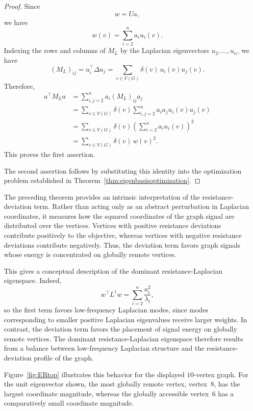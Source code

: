 \documentclass[12pt,a4paper]{amsart}
\theoremstyle{remark}
\theoremstyle{definition}
\newcommand{\1}{\mathbf{1}}
\newcommand{\0}{\mathbf{0}}
\begin{document}
\begin{proof}
Since
\[
w=Ua,
\]
we have
\[
w(v)
=
\sum_{i=2}^{n}a_i u_i(v).
\]
Indexing the rows and columns of $M_L$ by the Laplacian eigenvectors
$u_2,\ldots,u_n$, we have
\[
(M_L)_{ij}
=
u_i^\top\Delta u_j
=
\sum_{v\in V(G)}
\delta(v)\,u_i(v)u_j(v).
\]
Therefore,
\begin{align*}
a^\top M_La
&=
\sum_{i,j=2}^{n}
a_i(M_L)_{ij}a_j\\
&=
\sum_{v\in V(G)}
\delta(v)
\sum_{i,j=2}^{n}
a_i a_j u_i(v)u_j(v)\\
&=
\sum_{v\in V(G)}
\delta(v)
\left(
\sum_{i=2}^{n}
a_i u_i(v)
\right)^2\\
&=
\sum_{v\in V(G)}
\delta(v)\,w(v)^2.
\end{align*}
This proves the first assertion.

The second assertion follows by substituting this identity into the
optimization problem established in
Theorem~\ref{thm:eigenbasisoptimization}.
\end{proof}

The preceding theorem provides an intrinsic interpretation of the
resistance-deviation term. Rather than acting only as an abstract
perturbation in Laplacian coordinates, it measures how the squared
coordinates of the graph signal are distributed over the vertices.
Vertices with positive resistance deviations contribute positively to
the objective, whereas vertices with negative resistance deviations
contribute negatively. Thus, the deviation term favors graph signals
whose energy is concentrated on globally remote vertices.

This gives a conceptual description of the dominant
resistance-Laplacian eigenspace. Indeed,
\[
w^\top L^\dagger w
=
\sum_{i=2}^{n}\frac{a_i^2}{\lambda_i},
\]
so the first term favors low-frequency Laplacian modes, since modes
corresponding to smaller positive Laplacian eigenvalues receive larger
weights. In contrast, the deviation term favors the placement of
signal energy on globally remote vertices. The dominant
resistance-Laplacian eigenspace therefore results from a balance
between low-frequency Laplacian structure and the resistance-deviation
profile of the graph.

Figure~\ref{fig:ERtop} illustrates this behavior for the displayed
$10$-vertex graph. For the unit eigenvector shown, the most globally
remote vertex, vertex~$8$, has the largest coordinate magnitude,
whereas the globally accessible vertex~$6$ has a comparatively small
coordinate magnitude.
\end{document}
